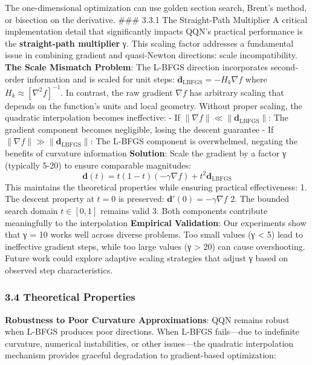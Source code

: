The one-dimensional optimization can use golden section search, Brent's method, or bisection on the derivative.
\#\#\# 3.3.1 The Straight-Path Multiplier
A critical implementation detail that significantly impacts QQN's practical performance is the \textbf{straight-path multiplier} γ. This scaling factor addresses a fundamental issue in combining gradient and quasi-Newton directions: scale incompatibility.
\textbf{The Scale Mismatch Problem}: The L-BFGS direction incorporates second-order information and is scaled for unit steps: \(\mathbf{d}_{\text{LBFGS}} = -H_k \nabla f\) where \(H_k \approx [\nabla^2 f]^{-1}\). In contrast, the raw gradient \(\nabla f\) has arbitrary scaling that depends on the function's units and local geometry.
Without proper scaling, the quadratic interpolation becomes ineffective:
- If \(\|\nabla f\| \ll \|\mathbf{d}_{\text{LBFGS}}\|\): The gradient component becomes negligible, losing the descent guarantee
- If \(\|\nabla f\| \gg \|\mathbf{d}_{\text{LBFGS}}\|\): The L-BFGS component is overwhelmed, negating the benefits of curvature information
\textbf{Solution}: Scale the gradient by a factor γ (typically 5-20) to ensure comparable magnitudes:
\[\mathbf{d}(t) = t(1-t)(-\gamma \nabla f) + t^2 \mathbf{d}_{\text{LBFGS}}\]
This maintains the theoretical properties while ensuring practical effectiveness:
1. The descent property at \(t=0\) is preserved: \(\mathbf{d}'(0) = -\gamma \nabla f\)
2. The bounded search domain \(t \in [0,1]\) remains valid
3. Both components contribute meaningfully to the interpolation
\textbf{Empirical Validation}: Our experiments show that γ = 10 works well across diverse problems. Too small values (γ \textless{} 5) lead to ineffective gradient steps, while too large values (γ \textgreater{} 20) can cause overshooting. Future work could explore adaptive scaling strategies that adjust γ based on observed step characteristics.

\hypertarget{theoretical-properties}{%
\subsubsection{3.4 Theoretical Properties}\label{theoretical-properties}}

\textbf{Robustness to Poor Curvature Approximations}: QQN remains robust when L-BFGS produces poor directions. When L-BFGS
fails---due to indefinite curvature, numerical instabilities, or other issues---the quadratic interpolation mechanism
provides graceful degradation to gradient-based optimization:

